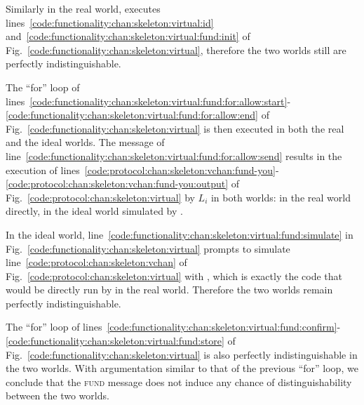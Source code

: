  Similarly in the real world, \alice executes
  lines~\ref{code:functionality:chan:skeleton:virtual:id}
  and~\ref{code:functionality:chan:skeleton:virtual:fund:init} of
  Fig.~\ref{code:functionality:chan:skeleton:virtual}, therefore the two
  worlds still are perfectly indistinguishable.

  The ``for'' loop of
  lines~\ref{code:functionality:chan:skeleton:virtual:fund:for:allow:start}-\ref{code:functionality:chan:skeleton:virtual:fund:for:allow:end}
  of Fig.~\ref{code:functionality:chan:skeleton:virtual} is then executed in
  both the real and the ideal worlds. The message of
  line~\ref{code:functionality:chan:skeleton:virtual:fund:for:allow:send}
  results in the execution of
  lines~\ref{code:protocol:chan:skeleton:vchan:fund-you}-\ref{code:protocol:chan:skeleton:vchan:fund-you:output}
  of Fig.~\ref{code:protocol:chan:skeleton:virtual} by $L_i$ in both worlds: in
  the real world directly, in the ideal world simulated by \simulator.

  In the ideal world,
  line~\ref{code:functionality:chan:skeleton:virtual:fund:simulate} in
  Fig.~\ref{code:functionality:chan:skeleton:virtual} prompts \simulator to
  simulate line~\ref{code:protocol:chan:skeleton:vchan} of
  Fig.~\ref{code:protocol:chan:skeleton:virtual} with \alice, which is exactly
  the code that would be directly run by \alice in the real world. Therefore the
  two worlds remain perfectly indistinguishable.

  The ``for'' loop of
  lines~\ref{code:functionality:chan:skeleton:virtual:fund:confirm}-\ref{code:functionality:chan:skeleton:virtual:fund:store}
  of Fig.~\ref{code:functionality:chan:skeleton:virtual} is also perfectly
  indistinguishable in the two worlds. With argumentation similar to that of the
  previous ``for'' loop, we conclude that the \textsc{fund} message does not
  induce any chance of distinguishability between the two worlds.

